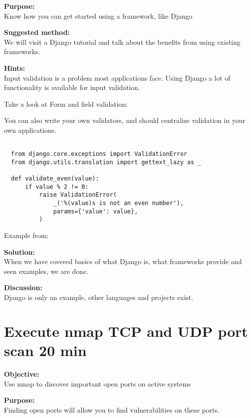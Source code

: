 \documentclass[a4paper,11pt,notitlepage]{report}
\begin{document}
{\bf Purpose:}\\
Know how you can get started using a framework, like Django\\ 

{\bf Suggested method:}\\
We will visit a Django tutorial and talk about the benefits from using existing frameworks.

{\bf Hints:}\\
Input validation is a problem most applications face. Using Django a lot of functionality is available for input validation.

Take a look at Form and field validation:\\

You can also write your own validators, and should centralize validation in your own applications.

\begin{verbatim}

  from django.core.exceptions import ValidationError
  from django.utils.translation import gettext_lazy as _

  def validate_even(value):
      if value % 2 != 0:
          raise ValidationError(
              _('%(value)s is not an even number'),
              params={'value': value},
          )
\end{verbatim}

Example from:

{\bf Solution:}\\
When we have covered basics of what Django is, what frameworks provide and seen examples, we are done.

{\bf Discussion:}\\
Django is only an example, other languages and projects exist.


\chapter{Execute nmap TCP and UDP port scan 20 min}
\label{ex:nmap-synscan}


{\bf Objective:} \\
Use nmap to discover important open ports on active systems

{\bf Purpose:}\\
Finding open ports will allow you to find vulnerabilities on these ports.
\end{document}
